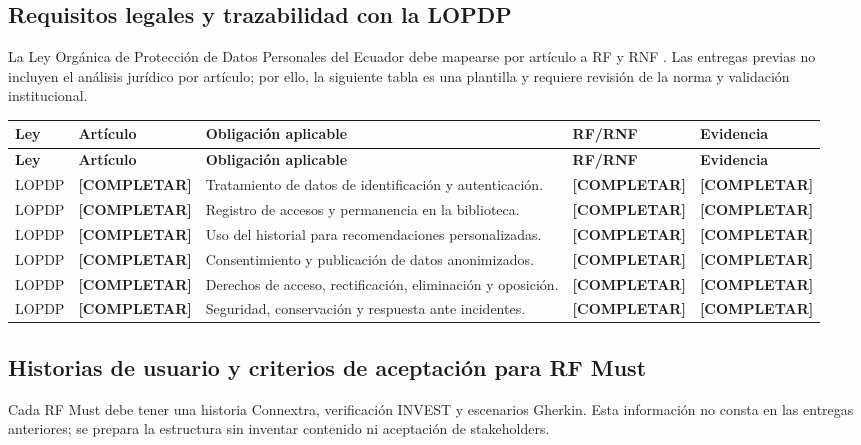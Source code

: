 \documentclass[12pt,journal,onecolumn]{IEEEtran}
\newcommand{\completar}{\textcolor{red!70!black}{\textbf{[COMPLETAR]}}}
\begin{document}
\subsection{Requisitos legales y trazabilidad con la LOPDP}
La Ley Orgánica de Protección de Datos Personales del Ecuador debe mapearse por artículo a RF y RNF \cite{lopdp2021}. Las entregas previas no incluyen el análisis jurídico por artículo; por ello, la siguiente tabla es una plantilla y requiere revisión de la norma y validación institucional.

\begin{longtable}{P{0.14\textwidth}P{0.12\textwidth}P{0.30\textwidth}P{0.18\textwidth}P{0.18\textwidth}}\toprule
\textbf{Ley} & \textbf{Artículo} & \textbf{Obligación aplicable} & \textbf{RF/RNF} & \textbf{Evidencia}\\\midrule\endfirsthead
\toprule\textbf{Ley} & \textbf{Artículo} & \textbf{Obligación aplicable} & \textbf{RF/RNF} & \textbf{Evidencia}\\\midrule\endhead
LOPDP & \completar & Tratamiento de datos de identificación y autenticación. & \completar & \completar\\
LOPDP & \completar & Registro de accesos y permanencia en la biblioteca. & \completar & \completar\\
LOPDP & \completar & Uso del historial para recomendaciones personalizadas. & \completar & \completar\\
LOPDP & \completar & Consentimiento y publicación de datos anonimizados. & \completar & \completar\\
LOPDP & \completar & Derechos de acceso, rectificación, eliminación y oposición. & \completar & \completar\\
LOPDP & \completar & Seguridad, conservación y respuesta ante incidentes. & \completar & \completar\\\bottomrule
\end{longtable}

\subsection{Historias de usuario y criterios de aceptación para RF Must}
Cada RF Must debe tener una historia Connextra, verificación INVEST y escenarios Gherkin. Esta información no consta en las entregas anteriores; se prepara la estructura sin inventar contenido ni aceptación de stakeholders.
\end{document}
